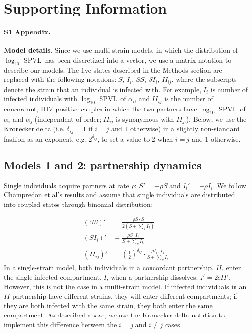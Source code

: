 \documentclass[10pt,letterpaper]{article}
\newcommand{\khalf}{\left(\frac{1}{2}\right)^{\delta_{ij}}}  %
\newcommand{\Lspvl}{$\log_{10}$ SPVL}
\begin{document}
\section*{Supporting Information}

\paragraph*{S1 Appendix.}
\label{S1_Appendix}
{\bf Model details.} Since we use multi-strain models, in which the distribution of \Lspvl\ has been discretized into a vector, we use a matrix notation to describe our models. The five states described in the Methods section are replaced with the following notations: $S$, $I_i$, $SS$, $SI_i$, $II_{ij}$, where the subscripts denote the strain that an individual is infected with. For example, $I_i$ is number of infected individuals with \Lspvl\ of $\alpha_i$, and $II_{ij}$ is the number of concordant, HIV-positive couples in which the two partners have \Lspvl\ of $\alpha_i$ and $\alpha_j$ (independent of order; $II_{ij}$ is synonymous with $II_{ji}$). 
Below, we use the Kronecker delta (i.e. $\delta_{ij}=1$ if $i=j$ and 1 otherwise) in a slightly non-standard fashion as an exponent, e.g. $2^{\delta_{ij}}$, to set a value to 2 when $i=j$ and 1 otherwise.

\subsection*{Models 1 and 2: partnership dynamics}

Single individuals acquire partners at rate $\rho$: $S' = - \rho S$ and $I_i' = - \rho I_i$. We follow Champredon et al's results and assume that single individuals are distributed into coupled states through binomial distribution:

\begin{equation}
\begin{aligned}
(SS)' &= \frac{\rho S \cdot S}{2 (S + \sum_k I_k)}\\
(SI_i)' &= \frac{\rho S \cdot I_i}{S + \sum_k I_k}\\
(II_{ij})' &= \khalf \cdot \frac{\rho I_i \cdot I_j}{S + \sum_k I_k}
\end{aligned}
\end{equation}
In a single-strain model, both individuals in a concordant partnership, $II$, enter the single-infected compartment, $I$, when a partnership dissolves: $I' = 2 c II'$. However, this is not the case in a multi-strain model. If infected individuals in an $II$ partnership have different strains, they will enter different compartments; if they are both infected with the same strain, they both enter the same compartment. As described above, we use the Kronecker delta notation to implement this difference between the $i=j$ and $i\neq j$ cases.
\end{document}
